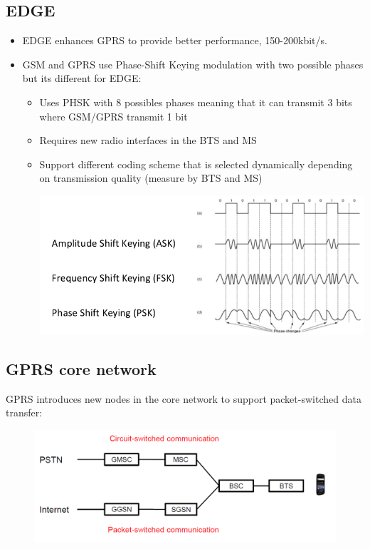 \subsection{EDGE}
\begin{itemize}
\item EDGE enhances GPRS to provide better performance, 150-200kbit/s. 
\item GSM and GPRS use Phase-Shift Keying modulation with two possible phases but its 
different for EDGE:

\begin{itemize}
	\item Uses PHSK with 8 possibles phases meaning that it can transmit
	3 bits where GSM/GPRS transmit 1 bit
	
	\item Requires new radio interfaces in the BTS and MS
	\item Support different coding scheme that is selected dynamically depending
	on transmission quality (measure by BTS and MS)

    \begin{center}
        \includegraphics[width=0.8\linewidth]{img/phase.png}
    \end{center}

\end{itemize}
\end{itemize}

\subsection{GPRS core network}

GPRS introduces new nodes in the core network to support 
packet-switched data transfer:
\begin{figure}
	\centering
	\includegraphics[scale=0.5]{img/gprs.png}
\end{figure}

